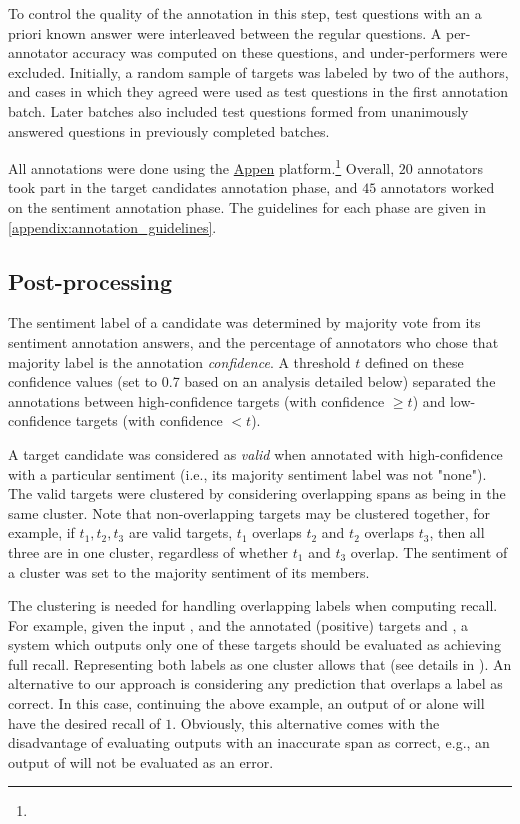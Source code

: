 To control the quality of the annotation in this step, 
test questions with an a priori known answer were 
interleaved 
between
the regular questions. 
A per-annotator accuracy was computed on these questions, and under-performers were excluded.
Initially, a random sample of targets was labeled by two of the authors, and cases in which they agreed were used as test questions in the first annotation batch.
Later batches also included test questions formed from unanimously answered questions in previously completed batches.

All annotations were done using the \href{www.appen.com}{Appen} platform.\footnote{}
Overall, $20$ annotators took part in the target candidates annotation phase, and $45$ annotators worked on the sentiment annotation phase. The guidelines for each phase are given in \supp \ref{appendix:annotation_guidelines}.

\subsection{Post-processing}

The 
sentiment label 
of a candidate 
was determined by majority vote from its sentiment annotation answers, and the percentage of annotators who chose that majority label is the annotation \emph{confidence}.
A threshold $t$ defined on these confidence values (set to 0.7 based on an analysis detailed below) separated the annotations between high-confidence targets (with confidence $\geq t$) and low-confidence targets (with confidence $<t$). 

A target candidate was considered as \emph{valid} when annotated with high-confidence with a particular sentiment (i.e., its majority sentiment label was not "none"). 
The valid targets were clustered by considering overlapping spans as being in the same cluster. Note 
that non-overlapping targets may be clustered together, for example, if $t_1,t_2,t_3$ are valid targets, $t_1$ overlaps $t_2$ and $t_2$ overlaps $t_3$, then all three are in one cluster, regardless of whether $t_1$ and $t_3$ overlap. The sentiment of a cluster was set to the majority sentiment of its members.

The clustering is needed for handling overlapping labels when computing recall. For example, given 
the input , and the annotated (positive) targets  and , a system which outputs only one of these targets should be evaluated as achieving full recall. 
Representing both labels as one cluster allows that (see details in ).
An alternative to our approach is considering any prediction that overlaps a label as correct. In this case, continuing the above example, an output of  or  alone will have the desired recall of $1$. 
Obviously, this alternative comes with the disadvantage of evaluating outputs with an inaccurate span as correct, e.g., an output of  will not be evaluated as an error.



